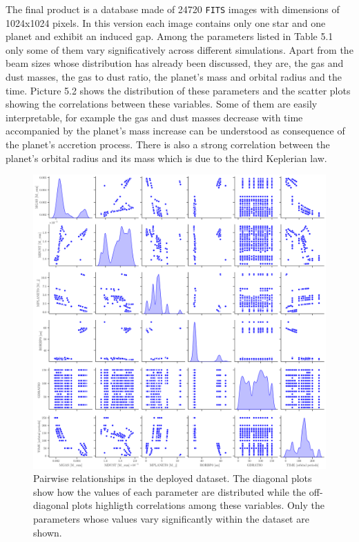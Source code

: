 \documentclass[a4paper,10pt]{report}
\begin{document}
The final product is a database made of 24720 \lstinline{FITS} images with dimensions of 1024x1024 pixels. In this
version each image contains only one star and one planet and exhibit an induced gap.
Among the parameters listed in Table 5.1 only some of them vary significatively across different simulations.
Apart from the beam sizes whose distribution has already been discussed, they are, the gas and dust masses, the gas to dust ratio, 
the planet's mass and orbital radius and the time. Picture 5.2 shows the distribution of these parameters and the scatter
plots showing the correlations between these variables. Some of them are easily interpretable, for example the
gas and dust masses decrease with time accompanied by the planet's mass increase can be understood as consequence of the planet's accretion
process. There is also a strong correlation between the planet's orbital radius and its mass which is due to the third Keplerian law.

\begin{figure}
    \begin{center}
        \includegraphics[width=\textwidth]{images/pairplot.png}
    \end{center}
    \caption{Pairwise relationships in the deployed dataset. The diagonal plots show how the values of each parameter are distributed
    while the off-diagonal plots highligth correlations among these variables. Only the parameters whose values vary
    significantly within the dataset are shown.}
\end{figure}
\end{document}

